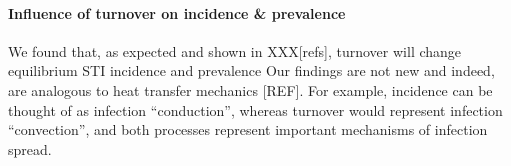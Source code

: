 \paragraph{Influence of turnover on incidence \& prevalence}			%
We found that, as expected and shown in XXX[refs],			%
turnover will change equilibrium STI incidence and prevalence 
Our findings are not new and indeed, are analogous to heat transfer mechanics [REF].				%
For example, incidence can be thought of as infection ``conduction'',		%
whereas turnover would represent infection ``convection'',
and both processes represent important mechanisms of infection spread.	%

